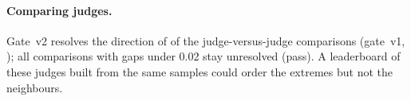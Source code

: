 \paragraph{Comparing judges.} Gate~v2 resolves the direction of \jPairsPass of the \jPairsTotal judge-versus-judge comparisons (gate~v1, \jPairsVonePub); all \jPairsClose comparisons with gaps under 0.02 stay unresolved (\jPairsClosePass pass). A leaderboard of these judges built from the same samples could order the extremes but not the neighbours.
